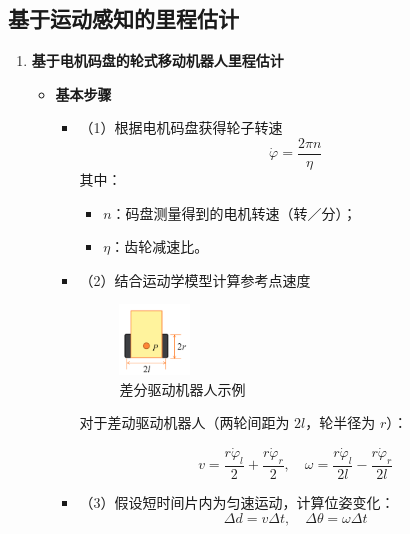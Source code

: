 \documentclass[../main.tex]{subfiles}
\begin{document}
\subsection{基于运动感知的里程估计}
\begin{enumerate}
    \item \textbf{基于电机码盘的轮式移动机器人里程估计}\label{mapan}
        \begin{itemize}
            \item \textbf{基本步骤}
            \begin{itemize}
                \item （1）根据电机码盘获得轮子转速  
                \[
                \dot{\varphi} = \frac{2\pi n}{\eta}
                \]
                其中：
                \begin{itemize}
                    \item \( n \)：码盘测量得到的电机转速（转／分）；
                    \item \( \eta \)：齿轮减速比。
                \end{itemize}
                
                \item （2）结合运动学模型计算参考点速度  
                    \begin{figure}[H]
                        \centering
                        \includegraphics[width=0.2\textwidth]{images/smallcar.png}
                        \caption{差分驱动机器人示例}
                    \end{figure}
                对于差动驱动机器人（两轮间距为 $2l$，轮半径为 $r$）：
                
                \[
                v = \frac{r \dot{\varphi}_l}{2} + \frac{r \dot{\varphi}_r}{2}, \quad
                \omega = \frac{r \dot{\varphi}_l}{2l} - \frac{r \dot{\varphi}_r}{2l}
                \]
                
                \item （3）假设短时间片内为匀速运动，计算位姿变化：
                \[
                \Delta d = v \Delta t, \quad \Delta \theta = \omega \Delta t
                \]


\end{itemize}
\end{itemize}
\end{enumerate}
\end{document}

